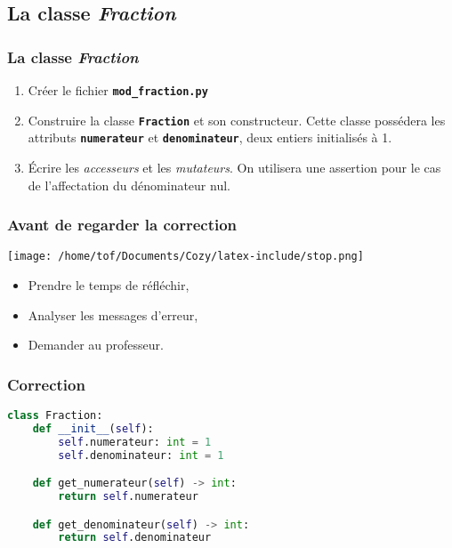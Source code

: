 \documentclass[svgnames,11pt]{beamer}
\begin{document}
\subsection{La classe \textbf{\emph{Fraction}}}
\begin{frame}
    \frametitle{La classe \textbf{\emph{Fraction}}}

    \begin{activite}
\begin{enumerate}
    \item Créer le fichier \textbf{\texttt{mod\_fraction.py}}
    \item Construire la classe \textbf{\texttt{Fraction}} et son constructeur. Cette classe possédera les attributs \textbf{\texttt{numerateur}} et \textbf{\texttt{denominateur}}, deux entiers initialisés à 1.
    \item Écrire les \emph{accesseurs} et les \emph{mutateurs}. On utilisera une assertion pour le cas de l'affectation du dénominateur nul.
\end{enumerate}
    \end{activite}

\end{frame}
\begin{frame}
    \frametitle{Avant de regarder la correction}
\begin{center}
    \centering
    \texttt{[image: /home/tof/Documents/Cozy/latex-include/stop.png]}
    \end{center}
{\Large
    \begin{itemize}
        \item Prendre le temps de réfléchir,
        \item Analyser les messages d'erreur,
        \item Demander au professeur.
    \end{itemize}
}
\end{frame}
\begin{frame}[fragile]
    \frametitle{Correction}

\begin{center}
\begin{lstlisting}[language=Python , basicstyle=\ttfamily\small, xleftmargin=2em, xrightmargin=1em]
class Fraction:
    def __init__(self):
        self.numerateur: int = 1
        self.denominateur: int = 1

    def get_numerateur(self) -> int:
        return self.numerateur

    def get_denominateur(self) -> int:
        return self.denominateur
\end{lstlisting}
\end{center}

\end{frame}
\end{document}
